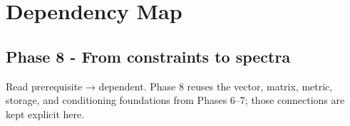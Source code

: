 \hypertarget{appendix-4ad47bdd269a}{}\label{referencestart:appendix-4ad47bdd269a}
\section{Dependency Map}\label{appendix-4ad47bdd269a-dependency-map}

\subsection{Phase 8 - From constraints to spectra}\label{appendix-4ad47bdd269a-phase-8---from-constraints-to-spectra}

Read prerequisite → dependent. Phase 8 reuses the vector, matrix, metric, storage, and conditioning foundations from Phases 6--7; those connections are kept explicit here.

